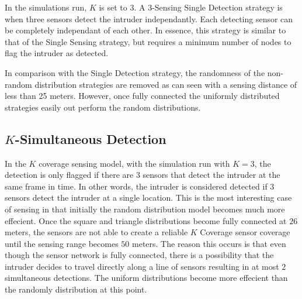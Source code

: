 \documentclass[10pt, conference, compsocconf, twocolumn]{IEEEtran}
\begin{document}
In the simulations run, $K$ is set to 3.  A $3$-Sensing Single
Detection strategy is when three sensors detect the intruder
independantly.  Each detecting sensor can be completely independant
of each other.  In essence, this strategy is similar to that of the
Single Sensing strategy, but requires a minimum number of nodes to
flag the intruder as detected.

In comparison with the Single Detection strategy, the randomness of
the non-random distribution strategies are removed as can seen with
a sensing distance of less than 25 meters.  However, once fully
connected the uniformly distributed strategies easily out perform
the random distributions.

\subsection{$K$-Simultaneous Detection}
%
%

In the $K$ coverage sensing model, with the simulation run with $K =
3$, the detection is only flagged if there are $3$ sensors that
detect the intruder at the same frame in time.  In other words, the
intruder is considered detected if $3$ sensors detect the intruder
at a single location.  This is the most interesting case of sensing
in that initially the random distribution model becomes much more
effecient.  Once the square and triangle distributions become fully
connected at $26$ meters, the sensors are not able to create a
reliable $K$ Coverage sensor coverage until the sensing range
becomes $50$ meters.  The reason this occurs is that even though
the sensor network is fully connected, there is a possibility that the
intruder decides to travel directly along a line of sensors resulting
in at most $2$ simultaneous detections.  The uniform distributions
become more effecient than the randomly distribution at this point.
\end{document}
